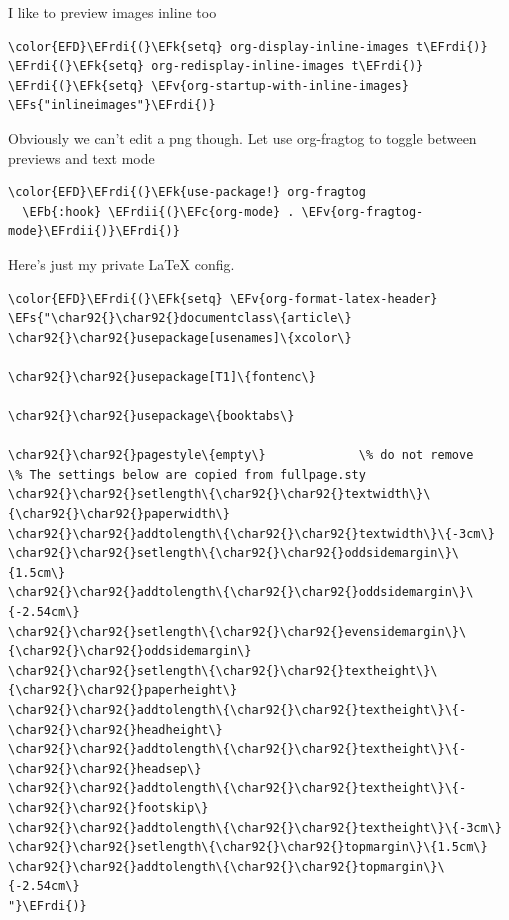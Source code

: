 \documentclass{scrartcl}
\newcommand{\EFk}[1]{\textcolor{EFk}{#1}} %
\newcommand{\EFs}[1]{\textcolor{EFs}{#1}} %
\newcommand{\EFb}[1]{\textcolor{EFb}{#1}} %
\newcommand{\EFc}[1]{\textcolor{EFc}{#1}} %
\newcommand{\EFv}[1]{\textcolor{EFv}{#1}} %
\newcommand{\EFrdi}[1]{#1} %
\newcommand{\EFrdii}[1]{#1} %
\begin{document}
I like to preview images inline too
\begin{Code}
\begin{Verbatim}[]
\color{EFD}\EFrdi{(}\EFk{setq} org-display-inline-images t\EFrdi{)}
\EFrdi{(}\EFk{setq} org-redisplay-inline-images t\EFrdi{)}
\EFrdi{(}\EFk{setq} \EFv{org-startup-with-inline-images} \EFs{"inlineimages"}\EFrdi{)}
\end{Verbatim}
\end{Code}

Obviously we can't edit a png though. Let use org-fragtog to toggle between previews and text mode
\begin{Code}
\begin{Verbatim}[]
\color{EFD}\EFrdi{(}\EFk{use-package!} org-fragtog
  \EFb{:hook} \EFrdii{(}\EFc{org-mode} . \EFv{org-fragtog-mode}\EFrdii{)}\EFrdi{)}
\end{Verbatim}
\end{Code}

Here's just my private \LaTeX{} config.
\begin{Code}
\begin{Verbatim}[]
\color{EFD}\EFrdi{(}\EFk{setq} \EFv{org-format-latex-header} \EFs{"\char92{}\char92{}documentclass\{article\}
\char92{}\char92{}usepackage[usenames]\{xcolor\}

\char92{}\char92{}usepackage[T1]\{fontenc\}

\char92{}\char92{}usepackage\{booktabs\}

\char92{}\char92{}pagestyle\{empty\}             \% do not remove
\% The settings below are copied from fullpage.sty
\char92{}\char92{}setlength\{\char92{}\char92{}textwidth\}\{\char92{}\char92{}paperwidth\}
\char92{}\char92{}addtolength\{\char92{}\char92{}textwidth\}\{-3cm\}
\char92{}\char92{}setlength\{\char92{}\char92{}oddsidemargin\}\{1.5cm\}
\char92{}\char92{}addtolength\{\char92{}\char92{}oddsidemargin\}\{-2.54cm\}
\char92{}\char92{}setlength\{\char92{}\char92{}evensidemargin\}\{\char92{}\char92{}oddsidemargin\}
\char92{}\char92{}setlength\{\char92{}\char92{}textheight\}\{\char92{}\char92{}paperheight\}
\char92{}\char92{}addtolength\{\char92{}\char92{}textheight\}\{-\char92{}\char92{}headheight\}
\char92{}\char92{}addtolength\{\char92{}\char92{}textheight\}\{-\char92{}\char92{}headsep\}
\char92{}\char92{}addtolength\{\char92{}\char92{}textheight\}\{-\char92{}\char92{}footskip\}
\char92{}\char92{}addtolength\{\char92{}\char92{}textheight\}\{-3cm\}
\char92{}\char92{}setlength\{\char92{}\char92{}topmargin\}\{1.5cm\}
\char92{}\char92{}addtolength\{\char92{}\char92{}topmargin\}\{-2.54cm\}
"}\EFrdi{)}
\end{Verbatim}
\end{Code}
\end{document}
